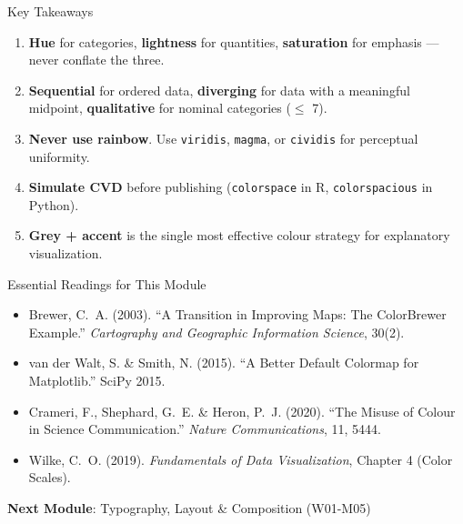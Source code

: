 \documentclass[10pt]{beamer}
\begin{document}
\begin{frame}{Key Takeaways}
  \begin{enumerate}
    \item \textbf{Hue} for categories, \textbf{lightness} for quantities,
          \textbf{saturation} for emphasis --- never conflate the three.
    \item \textbf{Sequential} for ordered data, \textbf{diverging} for
          data with a meaningful midpoint, \textbf{qualitative} for
          nominal categories ($\leq$ 7).
    \item \textbf{Never use rainbow}. Use \texttt{viridis}, \texttt{magma},
          or \texttt{cividis} for perceptual uniformity.
    \item \textbf{Simulate CVD} before publishing (\texttt{colorspace} in R,
          \texttt{colorspacious} in Python).
    \item \textbf{Grey + accent} is the single most effective colour strategy
          for explanatory visualization.
  \end{enumerate}
\end{frame}

\begin{frame}{Essential Readings for This Module}
  \begin{itemize}
    \item Brewer, C.~A. (2003). ``A Transition in Improving Maps: The
          ColorBrewer Example.'' \emph{Cartography and Geographic
          Information Science}, 30(2).
    \item van der Walt, S. \& Smith, N. (2015). ``A Better Default
          Colormap for Matplotlib.'' SciPy 2015.
    \item Crameri, F., Shephard, G.~E. \& Heron, P.~J. (2020). ``The
          Misuse of Colour in Science Communication.''
          \emph{Nature Communications}, 11, 5444.
    \item Wilke, C.~O. (2019). \emph{Fundamentals of Data Visualization},
          Chapter 4 (Color Scales).
  \end{itemize}

  \vspace{6pt}
  \textbf{Next Module}: Typography, Layout \& Composition (W01-M05)
\end{frame}
\end{document}
